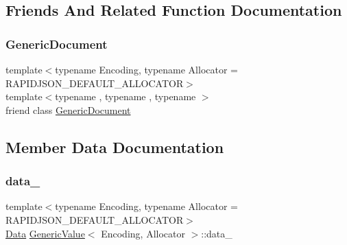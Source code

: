 \subsection{Friends And Related Function Documentation}
\mbox{\label{classGenericValue_ab05bc9e52e201a2867ea5bac141ee1ae}} 
\subsubsection{\texorpdfstring{Generic\+Document}{GenericDocument}}
{\footnotesize\ttfamily template$<$typename Encoding, typename Allocator = R\+A\+P\+I\+D\+J\+S\+O\+N\+\_\+\+D\+E\+F\+A\+U\+L\+T\+\_\+\+A\+L\+L\+O\+C\+A\+T\+OR$>$ \\
template$<$typename , typename , typename $>$ \\
friend class \hyperlink{classGenericDocument}{Generic\+Document}\hspace{0.3cm}{\ttfamily [friend]}}



\subsection{Member Data Documentation}
\mbox{\label{classGenericValue_aaf80f2c91d26fdde60b9edeeecd3509f}} 
\subsubsection{\texorpdfstring{data\+\_\+}{data\_}}
{\footnotesize\ttfamily template$<$typename Encoding, typename Allocator = R\+A\+P\+I\+D\+J\+S\+O\+N\+\_\+\+D\+E\+F\+A\+U\+L\+T\+\_\+\+A\+L\+L\+O\+C\+A\+T\+OR$>$ \\
\hyperlink{unionGenericValue_1_1Data}{Data} \hyperlink{classGenericValue}{Generic\+Value}$<$ Encoding, Allocator $>$\+::data\+\_\+}

\mbox{\label{classGenericValue_a188f57bdb1923c1fefe74baa995871a3}} 

